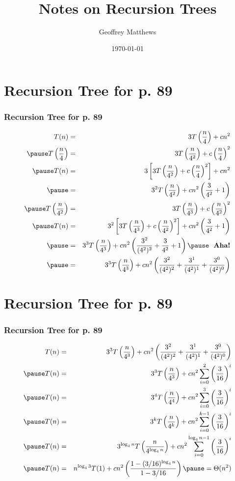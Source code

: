 \documentclass{beamer}
\title[Notes on Recursion Trees]
{
 Notes on Recursion Trees
}
\subtitle{} %
\author[Geoffrey Matthews]
{Geoffrey Matthews}
\institute[WWU/CS]
{
  Department of Computer Science\\
  Western Washington University
}
\date{\today}
\newcommand{\sect}[1]{
\section{#1}
\begin{frame}[fragile]\frametitle{#1}
}
\begin{document}
\begin{frame}
  \titlepage
\end{frame}


\newcommand{\myref}[1]{\small\item\url{#1}}
\newcommand{\myreft}[1]{\footnotesize\item\url{#1}}


\sect{Recursion Tree for p. 89}
\begin{eqnarray*}
T(n) &=& 3T\left(\frac{n}{4}\right)+ cn^2\\\pause
T\left(\frac{n}{4}\right) &=& 3T\left(\frac{n}{4^2}\right)  + c\left(\frac{n}{4}\right)^2\\\pause
T(n) &=& 3\left[3T\left(\frac{n}{4^2}\right)  + c\left(\frac{n}{4}\right)^2\right]
+ cn^2\\\pause
&=& 3^2T\left(\frac{n}{4^2}\right) + cn^2\left(\frac{3}{4^2} + 1\right)\\\pause
T\left(\frac{n}{4^2}\right) &=&
3T\left(\frac{n}{4^3}\right) + c\left(\frac{n}{4^2}\right)^2\\\pause
T(n) &=& 3^2\left[3T\left(\frac{n}{4^3}\right) + c\left(\frac{n}{4^2}\right)^2\right] + cn^2\left(\frac{3}{4^2} + 1\right)\\\pause
&=& 3^3T\left(\frac{n}{4^3}\right) + cn^2\left(\frac{3^2}{(4^2)^2} + \frac{3}{4^2} + 1\right)\pause\mbox{\ \ \bf Aha!}\\\pause
&=& 3^3T\left(\frac{n}{4^3}\right) + cn^2\left(\frac{3^2}{(4^2)^2} + \frac{3^1}{(4^2)^1} + \frac{3^0}{(4^2)^0}\right)\\
\end{eqnarray*}
\end{frame}

\sect{Recursion Tree for p. 89}
\begin{eqnarray*}
T(n) &=& 3^3T\left(\frac{n}{4^3}\right) + cn^2\left(\frac{3^2}{(4^2)^2} + \frac{3^1}{(4^2)^1} + \frac{3^0}{(4^2)^0}\right)\\\pause
T(n) &=& 3^3T\left(\frac{n}{4^3}\right) + cn^2\sum_{i=0}^{2} \left(\frac{3}{16}\right)^i\\\pause
T(n) &=& 3^4T\left(\frac{n}{4^4}\right) + cn^2\sum_{i=0}^{3} \left(\frac{3}{16}\right)^i\\\pause
T(n) &=& 3^kT\left(\frac{n}{4^k}\right) + cn^2\sum_{i=0}^{k-1} \left(\frac{3}{16}\right)^i\\\pause
T(n) &=& 3^{\log_4 n}T\left(\frac{n}{4^{\log_4 n}}\right) + cn^2\sum_{i=0}^{\log_4 n -1} \left(\frac{3}{16}\right)^i\\\pause
T(n) &=& n^{\log_4 3}T(1) + cn^2\left(\frac{1-(3/16)^{\log_4 n}}{1-3/16}\right)\pause = \Theta(n^2)
\end{eqnarray*}
\end{frame}
\end{document}
